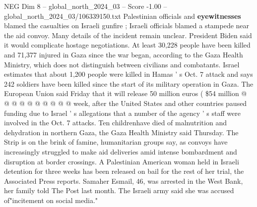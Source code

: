 \begin{textsample}{NEG Dim 8 – global\_north\_2024\_03 – Score -1.00 – global\_north\_2024\_03/106339150.txt}
Palestinian officials and \textbf{eyewitnesses} blamed the casualties on Israeli gunfire ; Israeli officials blamed a stampede near the aid convoy.
Many details of the incident remain unclear.
President Biden said it would complicate hostage negotiations.
At least 30,228 people have been killed and 71,377 injured in Gaza since the war began, according to the Gaza Health Ministry, which does not distinguish between civilians and combatants.
Israel estimates that about 1,200 people were killed in Hamas ' s Oct. 7 attack and says 242 soldiers have been killed since the start of its military operation in Gaza.
The European Union said Friday that it will release 50 million euros ( \$54 million @ @ @ @ @ @ @ @ @ @ week, after the United States and other countries paused funding due to Israel ' s allegations that a number of the agency ' s staff were involved in the Oct. 7 attacks.
Ten childrenhave died of malnutrition and dehydration in northern Gaza, the Gaza Health Ministry said Thursday.
The Strip is on the brink of famine, humanitarian groups say, as convoys have increasingly struggled to make aid deliveries amid intense bombardment and disruption at border crossings.
A Palestinian American woman held in Israeli detention for three weeks has been released on bail for the rest of her trial, the Associated Press reports.
Samaher Esmail, 46, was arrested in the West Bank, her family told The Post last month.
The Israeli army said she was accused of"incitement on social media."

\end{textsample}
